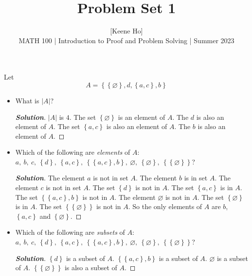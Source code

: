 \documentclass[11pt]{article}
\newenvironment{problem}[2][Problem\!]{\begin{trivlist}
\item[\hskip \labelsep {\bfseries #1}\hskip \labelsep {\bfseries #2.}]}{\end{trivlist}}
\newenvironment{solution}{\begin{proof}[\textbf{\textit{Solution}}]}{\end{proof}}
\newcommand{\abs}[1]{\left\lvert#1\right\rvert} %
\newcommand{\set}[1]{\left\{#1\right\}} %
\renewcommand{\emptyset}{\varnothing}
\begin{document}
 
\title{Problem Set 1}
\author{[Keene Ho]\\[0.5em]
MATH 100 | Introduction to Proof and Problem Solving | Summer 2023}
\date{} 
\maketitle


\begin{problem}{1.1}
Let 
\[A = \set{\set{\emptyset},d,\set{a,c},b}\]
\begin{itemize}[itemsep=3em]
\item[(a)] What is $\abs{A}$?
\begin{solution}\hfill %
\(|A|\) is \(4\). The set \(\set{\emptyset}\) is an element of \(A\). The \(d\) is also an element of \(A\). The set \(\set{a,c}\) is also an element of \(A\). The \(b\) is also an element of \(A\).
\end{solution}

\item[(b)] Which of the following are \emph{elements} of $A$: $a,\ b,\ c,\ \set{d},\ \set{a,c},\ \set{\set{a,c},b},\ \emptyset,\ \set{\emptyset},\ \set{\set{\emptyset}}$?
\begin{solution}\hfill %
The element \(a\) is not in set \(A\). The element \(b\) is in set \(A\). The element \(c\) is not in set \(A\). The set \(\set{d}\) is not in \(A\). The set \(\set{a,c}\) is in \(A\). The set \(\set{\set{a,c},b}\) is not in \(A\). The element \(\emptyset\) is not in \(A\). The set \(\set{\emptyset}\) is in \(A\). The set \(\set{\set{\emptyset}}\) is not in \(A\). So the only elements of \(A\) are \(b\), \(\set{a,c}\) and \(\set{\emptyset}\).
\end{solution}

\item[(c)] Which of the following are \emph{subsets} of $A$: $a,\ b,\ c,\ \set{d},\ \set{a,c},\ \set{\set{a,c},b},\ \emptyset,\ \set{\emptyset},\ \set{\set{\emptyset}}$?
\begin{solution}\hfill %
\(\set{d}\) is a subset of \(A\). \(\set{\set{a,c},b}\) is a subset of \(A\). \(\emptyset\) is a subset of \(A\). \(\set{\set{\emptyset}}\) is also a subset of \(A\).
\end{solution}


\end{itemize}
\end{problem}
\end{document}
